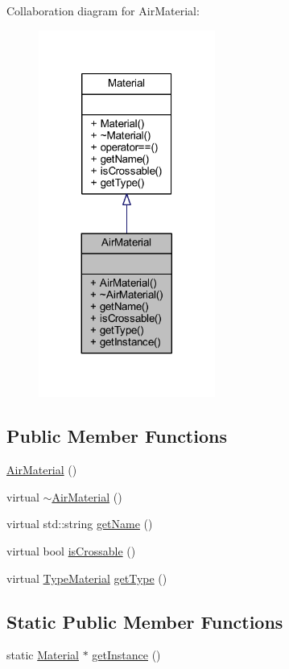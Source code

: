 Collaboration diagram for Air\+Material\+:\nopagebreak
\begin{figure}[H]
\begin{center}
\leavevmode
\includegraphics[width=164pt]{class_air_material__coll__graph}
\end{center}
\end{figure}
\subsection*{Public Member Functions}
\begin{DoxyCompactItemize}
\item 
\hyperlink{class_air_material_a42e3e9ef1e6fe02e89c41c48ee1687f3}{Air\+Material} ()
\item 
virtual \hyperlink{class_air_material_ad98614202a606bff3e1621586b27ff91}{$\sim$\+Air\+Material} ()
\item 
virtual std\+::string \hyperlink{class_air_material_ad6a19a839af9a8fe9b1d6819f7738af2}{get\+Name} ()
\item 
virtual bool \hyperlink{class_air_material_a4496bd6bbfc2a01acc745f13871f0659}{is\+Crossable} ()
\item 
virtual \hyperlink{_material_8hpp_af43d43a4fff6221e289f8d3db9904ec0}{Type\+Material} \hyperlink{class_air_material_ab33fcf254fa464e6a8e7d8e376ca2f02}{get\+Type} ()
\end{DoxyCompactItemize}
\subsection*{Static Public Member Functions}
\begin{DoxyCompactItemize}
\item 
static \hyperlink{class_material}{Material} $\ast$ \hyperlink{class_air_material_a9e64e9a99d6b20dcfa53c6afdcb5fca5}{get\+Instance} ()
\end{DoxyCompactItemize}



